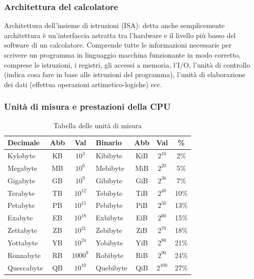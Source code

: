 \subsubsection{Architettura del calcolatore}
Architettura dell’insieme di istruzioni (ISA): detta anche semplicemente architettura è un'interfaccia astratta tra l’hardware e il livello più basso del software di un calcolatore. Comprende tutte le informazioni necessarie per scrivere un programma in linguaggio macchina funzionante in modo corretto, comprese le istruzioni, i registri, gli accessi a memoria, l’I/O, l'unità di controllo (indica cosa fare in base alle
istruzioni del programma), l'unità di elaborazione dei dati (effettua operazioni artimetico-logiche) ecc.

\subsubsection{Unità di misura e prestazioni della CPU}
\begin{table}[H]
    \centering
    \begin{tabular}{|l|c|c|l|c|c|c|}
        \hline
         \textbf{Decimale} & \textbf{Abb} & \textbf{Val} & \textbf{Binario} & \textbf{Abb} & \textbf{Val} & \textbf{\%} \\\hline\hline
         Kylobyte & KB & $10^3$ & Kibibyte & KiB & $2^{10}$ & 2\%\\\hline
         Megabyte & MB & $10^6$ & Mebibyte & MiB & $2^{20}$ & 5\%\\\hline
         Gigabyte & GB & $10^9$ & Gibibyte & GiB & $2^{30}$ & 7\%\\\hline
         Terabyte & TB & $10^{12}$ & Tebibyte & TiB & $2^{40}$ & 10\%\\\hline
         Petabyte & PB & $10^{15}$ & Pebibyte & PiB & $2^{50}$ & 13\%\\\hline
         Exabyte & EB & $10^{18}$ & Exbibyte & EiB & $2^{60}$ & 15\%\\\hline
         Zettabyte & ZB & $10^{21}$ & Zebibyte & ZiB & $2^{70}$ & 18\%\\\hline
         Yottabyte & YB & $10^{24}$ & Yobibyte & YiB & $2^{80}$ & 21\%\\\hline
         Ronnabyte & RB & $1000^9$ & Robibyte & RiB & $2^{90}$ & 24\%\\\hline
         Queccabyte & QB & $10^{10}$ & Quebibyte & QiB & $2^{100}$ & 27\%\\\hline
         
    \end{tabular}
    \caption{Tabella delle unità di misura}
    \label{tab:unità_di_misura}
\end{table}

